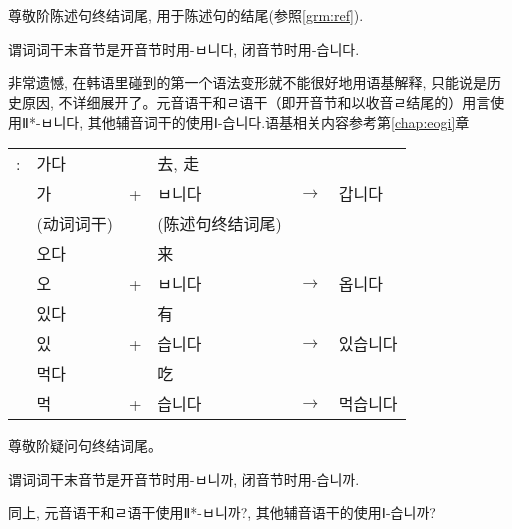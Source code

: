 \section{\kr{}}
\begin{grammar}
	\begin{grammarsect}
		\begin{itemize}
			\item 尊敬阶陈述句终结词尾, 用于陈述句的结尾(参照\ref{grm:ref}).
			\item 谓词词干末音节是开音节时用{\kr -ㅂ니다}, 闭音节时用{\kr -습니다.}
			      {\color{gray} \item 非常遗憾, 在韩语里碰到的第一个语法变形就不能很好地用语基解释, 只能说是历史原因, 不详细展开了。元音语干和{\kr ㄹ}语干（即开音节和以收音{\kr ㄹ}结尾的）用言使用Ⅱ*{\kr -ㅂ니다}, 其他辅音词干的使用Ⅰ{\kr -습니다.}语基相关内容参考第\ref{chap:eogi}章}
		\end{itemize}
		\begin{tabular}{llllll}
			\kr \ruby{例}{예}: & \kr 가다 &   & 去, 走                         \\
                            & \kr 가  & + & \kr ㅂ니다   & $\to$ & \kr 갑니다  \\
                            & (动词词干) &   & (陈述句终结词尾)                    \\
                            & \kr 오다 &   & 来                            \\
                            & \kr 오  & + & \kr ㅂ니다   & $\to$ & \kr 옵니다  \\
                            & \kr 있다 &   & 有                            \\
                            & \kr 있  & + & \kr 습니다   & $\to$ & \kr 있습니다 \\
                            & \kr 먹다 &   & 吃                            \\
                            & \kr 먹  & + & \kr 습니다   & $\to$ & \kr 먹습니다 \\
		\end{tabular}
	\end{grammarsect}
	\begin{grammarsect}
		\begin{itemize}
			\item 尊敬阶疑问句终结词尾。
			\item 谓词词干末音节是开音节时用{\kr -ㅂ니까}, 闭音节时用{\kr -습니까}.
			      {\color{gray} \item 同上, 元音语干和{\kr ㄹ}语干使用Ⅱ*{\kr -ㅂ니까?}, 其他辅音语干的使用Ⅰ{\kr -습니까?}}

\end{itemize}
\end{grammarsect}
\end{grammar}
